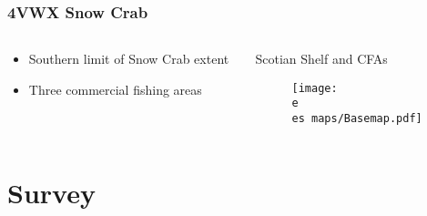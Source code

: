\begin{frame}
\frametitle{4VWX Snow Crab}
	\begin{columns}[T]
	\begin{column}{0.4\textwidth}
	\begin{itemize}
		\item Southern limit of Snow Crab extent
		\item Three commercial fishing areas
	\end{itemize}
	\end{column}
	
	\begin{column}{0.6\textwidth}
	\begin{centering}
	Scotian Shelf and CFAs
		\begin{figure}
  		\texttt{[image: \\e \\es maps/Basemap.pdf]}
  		\end{figure}
  		\end{centering}
 	\end{column}
 	\end{columns}
\end{frame}


\section{Survey}

